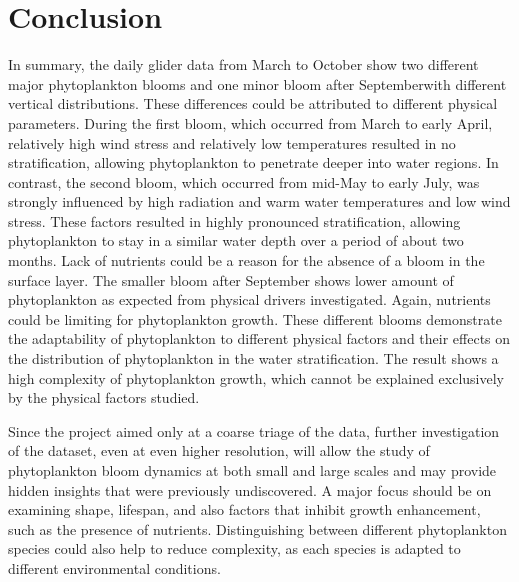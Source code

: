 \documentclass[../Main.tex]{subfiles}
\begin{document}
\section*{\crule[blue]{.3cm}{.3cm} Conclusion}
In summary, the daily glider data from March to October show two different major phytoplankton blooms and one minor bloom after Septemberwith different vertical distributions. These differences could be attributed to different physical parameters.
During the first bloom, which occurred from March to early April, relatively high wind stress and relatively low temperatures resulted in no stratification, allowing phytoplankton to penetrate deeper into water regions.
In contrast, the second bloom, which occurred from mid-May to early July, was strongly influenced by high radiation and warm water temperatures and low wind stress.
These factors resulted in highly pronounced stratification, allowing phytoplankton to stay in a similar water depth over a period of about two months.
Lack of nutrients could be a reason for the absence of a bloom in the surface layer.
The smaller bloom after September shows lower amount of phytoplankton as expected from physical drivers investigated.
Again, nutrients could be limiting for phytoplankton growth.
These different blooms demonstrate the adaptability of phytoplankton to different physical factors and their effects on the distribution of phytoplankton in the water stratification.
The result shows a high complexity of phytoplankton growth, which cannot be explained exclusively by the physical factors studied.

Since the project aimed only at a coarse triage of the data, further investigation of the dataset, even at even higher resolution, will allow the study of phytoplankton bloom dynamics at both small and large scales and may provide hidden insights that were previously undiscovered.
A major focus should be on examining shape, lifespan, and also factors that inhibit growth enhancement, such as the presence of nutrients.
Distinguishing between different phytoplankton species could also help to reduce complexity, as each species is adapted to different environmental conditions. 
\end{document}
